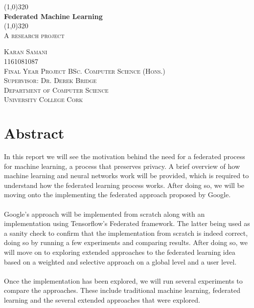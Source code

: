 \documentclass[12pt]{article}
\begin{document}
\makeatletter

\begin{titlepage}
	\begin{center}
		\line(1,0){320}\\				
		[0.32cm]
		\huge{\bfseries Federated Machine Learning}\\
		[0.16cm]		
		\line(1,0){320}\\
		[0.64cm]		
		\textsc{\LARGE A research project}\\
		[10cm]
	\end{center}
	\begin{center}
		\textsc{\large Karan Samani}\\
		\textsc{\large 1161081087}\\
		\textsc{\large Final Year Project BSc. Computer Science (Hons.)}\\
		\textsc{\large Supervisor: Dr. Derek Bridge}\\
		\textsc{\large Department of Computer Science}\\
		\textsc{\large University College Cork}\\
		\textsc{\large \@date}
	\end{center}
\end{titlepage}
\cleardoublepage

\section*{Abstract}
In this report we will see the motivation behind the need for a federated process for machine learning, a process that preserves privacy. A brief overview of how machine learning and neural networks work will be provided, which is required to understand how the federated learning process works. After doing so, we will be moving onto the implementing the federated approach proposed by Google.
\\\\
Google's approach will be implemented from scratch along with an implementation using Tensorflow's Federated framework. The latter being used as a sanity check to confirm that the implementation from scratch is indeed correct, doing so by running a few experiments and comparing results. After doing so, we will move on to exploring extended approaches to the federated learning idea based on a weighted and selective approach on a global level and a user level.
\\\\ 
Once the implementation has been explored, we will run several experiments to compare the approaches. These include traditional machine learning, federated learning and the several extended approaches that were explored.
\clearpage
\end{document}
